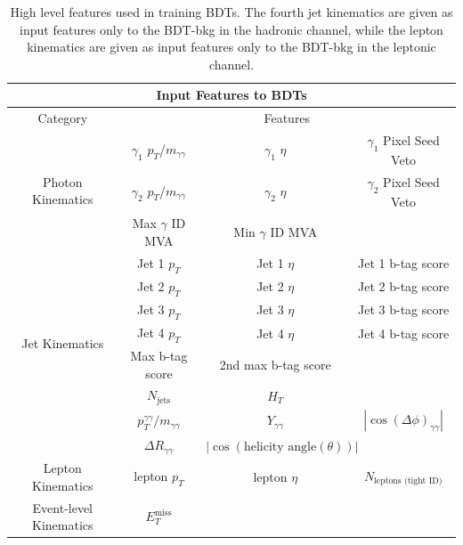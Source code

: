 \begin{table}[h] \scriptsize
\centering
\renewcommand{\arraystretch}{1.5}
\begin{tabular}{|c| c c c|}
\multicolumn{4}{c}{Input Features to BDTs} \\ \hline
Category & \multicolumn{3}{c|}{Features} \\ \hline
\multirow{3}{*}{Photon Kinematics} & $\gamma_1$ $p_T$/$m_{\gamma \gamma}$ & $\gamma_1$ $\eta$ & $\gamma_1$ Pixel Seed Veto \\
& $\gamma_2$ $p_T$/$m_{\gamma \gamma}$ & $\gamma_2$ $\eta$ & $\gamma_2$ Pixel Seed Veto \\
& Max $\gamma$ ID MVA & Min $\gamma$ ID MVA & \\ \hline
\multirow{7}{*}{Jet Kinematics} & Jet 1 $p_T$ & Jet 1 $\eta$ & Jet 1 b-tag score \\
& Jet 2 $p_T$ & Jet 2 $\eta$ & Jet 2 b-tag score \\
& Jet 3 $p_T$ & Jet 3 $\eta$ & Jet 3 b-tag score \\
& Jet 4 $p_T$ & Jet 4 $\eta$ & Jet 4 b-tag score \\
& Max b-tag score & 2nd max b-tag score & \\
& $N_{\text{jets}}$ & $H_T$ & \\ \hline
\multirow{2}{*}{DiPhoton Kinematics} & $p_T^{\gamma \gamma} / m_{\gamma \gamma}$ & $Y_{\gamma \gamma}$ & $|\cos (\Delta \phi)_{\gamma \gamma}|$ \\
& $\Delta R_{\gamma \gamma}$ & $|\cos(\text{helicity angle} (\theta))|$ & \\ \hline
Lepton Kinematics & lepton $p_T$ & lepton $\eta$ & $N_{\text{leptons (tight ID)}}$ \\ \hline
\multirow{1}{*}{Event-level Kinematics} & $E_T^{\text{miss}}$ & & \\ \hline
\end{tabular}
\caption{High level features used in training BDTs. The fourth jet kinematics are given as input features only to the BDT-bkg in the hadronic channel, while the lepton kinematics are given as input features only to the BDT-bkg in the leptonic channel.} 
\label{tab:tth_hlf}
\end{table}

